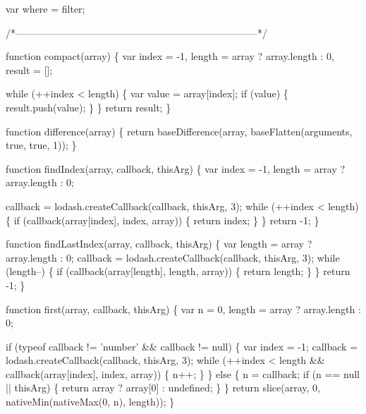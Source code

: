 \begin{DoxyCodeInclude}
    var where = filter;

    \textcolor{comment}{/*--------------------------------------------------------------------------*/}

    \textcolor{keyword}{function} compact(array) \{
      var index = -1,
          length = array ? array.length : 0,
          result = [];

      \textcolor{keywordflow}{while} (++index < length) \{
        var value = array[index];
        \textcolor{keywordflow}{if} (value) \{
          result.push(value);
        \}
      \}
      \textcolor{keywordflow}{return} result;
    \}

    \textcolor{keyword}{function} difference(array) \{
      \textcolor{keywordflow}{return} baseDifference(array, baseFlatten(arguments, \textcolor{keyword}{true}, \textcolor{keyword}{true}, 1));
    \}

    \textcolor{keyword}{function} findIndex(array, callback, thisArg) \{
      var index = -1,
          length = array ? array.length : 0;

      callback = lodash.createCallback(callback, thisArg, 3);
      \textcolor{keywordflow}{while} (++index < length) \{
        \textcolor{keywordflow}{if} (callback(array[index], index, array)) \{
          \textcolor{keywordflow}{return} index;
        \}
      \}
      \textcolor{keywordflow}{return} -1;
    \}

    \textcolor{keyword}{function} findLastIndex(array, callback, thisArg) \{
      var length = array ? array.length : 0;
      callback = lodash.createCallback(callback, thisArg, 3);
      \textcolor{keywordflow}{while} (length--) \{
        \textcolor{keywordflow}{if} (callback(array[length], length, array)) \{
          \textcolor{keywordflow}{return} length;
        \}
      \}
      \textcolor{keywordflow}{return} -1;
    \}

    \textcolor{keyword}{function} first(array, callback, thisArg) \{
      var n = 0,
          length = array ? array.length : 0;

      \textcolor{keywordflow}{if} (typeof callback != \textcolor{stringliteral}{'number'} && callback != null) \{
        var index = -1;
        callback = lodash.createCallback(callback, thisArg, 3);
        \textcolor{keywordflow}{while} (++index < length && callback(array[index], index, array)) \{
          n++;
        \}
      \} \textcolor{keywordflow}{else} \{
        n = callback;
        \textcolor{keywordflow}{if} (n == null || thisArg) \{
          \textcolor{keywordflow}{return} array ? array[0] : undefined;
        \}
      \}
      \textcolor{keywordflow}{return} slice(array, 0, nativeMin(nativeMax(0, n), length));
    \}


\end{DoxyCodeInclude}
